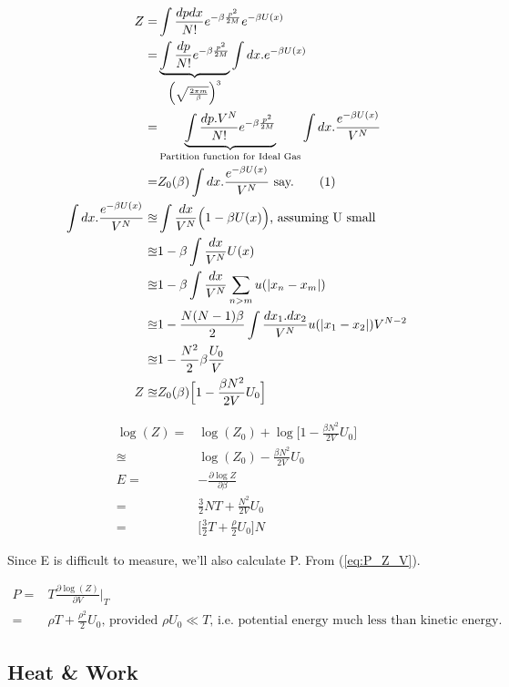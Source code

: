 \documentclass[]{article}
\newcommand\numberthis{\addtocounter{equation}{1}\tag{\theequation}}
\begin{document}
\begin{align*}
Z =& \int \frac{dp dx}{N!} e^{- \beta \frac{p^2}{2M}} e^{-\beta U(x)}\\
=&\underbrace{ \int \frac{dp}{N!} e^{- \beta \frac{p^2}{2M}}}_{\Big(\sqrt{\frac{2\pi m}{\beta}}\Big)^3} \int dx.e^{-\beta U(x)}\\
=&\underbrace{ \int \frac{dp.V^N}{N!} e^{- \beta \frac{p^2}{2M}}}_{\text{Partition function for Ideal Gas}} \int dx.\frac{e^{-\beta U(x)}}{V^N}\\
=&Z_0(\beta) \int dx.\frac{e^{-\beta U(x)}}{V^N}\text{ say.}\numberthis \label{eq:introducingZ0}\\
\int dx.\frac{e^{-\beta U(x)}}{V^N}\approxeq& \int \frac{dx}{V^N} \Big(1 - \beta U(x)\Big)\text{, assuming U small}\\
\approxeq & 1 - \beta \int \frac{dx}{V^N} U(x)\\
\approxeq & 1 - \beta \int \frac{dx}{V^N} \sum_{n>m} u(\vert x_n - x_m\vert)\\
\approxeq & 1 - \frac{N(N-1)\beta}{2} \int \frac{dx_1.dx_2}{V^N}  u(\vert x_1 - x_2\vert) V^{N-2}\\
\approxeq& 1 - \frac{N^2}{2}\beta \frac{U_0}{V}\\
Z \approxeq& Z_0(\beta) \Big[1 - \frac{\beta N^2}{2V} U_0\Big]
\end{align*}

\begin{align*}
\log(Z) =& \log(Z_0) + \log\Big[1 - \frac{\beta N^2}{2V} U_0\Big] \\
\approxeq & \log(Z_0) - \frac{\beta N^2}{2V} U_0\\
E =& - \frac{\partial \log Z}{\partial \beta}\\
=& \frac{3}{2}NT + \frac{N^2}{2V}U_0\\
=& \Big[\frac{3}{2}T + \frac{ \rho}{2}U_0\Big] N
\end{align*}

Since E is difficult to measure, we'll also calculate P. From (\ref{eq:P_Z_V}).

\begin{align*}
P =& T \frac{\partial \log(Z)}{\partial V}\bigg|_T\\
=& \rho T + \frac{\rho^2}{2} U_0\text{, provided $\rho U_0 \ll T$, i.e. potential energy much less than kinetic energy.}
\end{align*}

\subsection{Heat \& Work}
\end{document}
